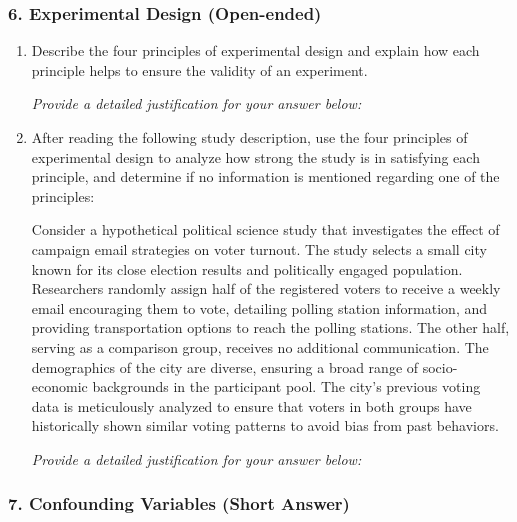 \documentclass{article}
\begin{document}
\subsubsection*{6. Experimental Design (Open-ended)}
\begin{enumerate}
    \item Describe the four principles of experimental design and explain how each principle helps to ensure the validity of an experiment.
    \par \emph{Provide a detailed justification for your answer below:}
        \begin{center}
        \end{center}
    \item After reading the following study description, use the four principles of experimental design to analyze how strong the study is in satisfying each principle, and determine if no information is mentioned regarding one of the principles:
    \par Consider a hypothetical political science study that investigates the effect of campaign email strategies on voter turnout. The study selects a small city known for its close election results and politically engaged population. Researchers randomly assign half of the registered voters to receive a weekly email encouraging them to vote, detailing polling station information, and providing transportation options to reach the polling stations. The other half, serving as a comparison group, receives no additional communication. The demographics of the city are diverse, ensuring a broad range of socio-economic backgrounds in the participant pool. The city’s previous voting data is meticulously analyzed to ensure that voters in both groups have historically shown similar voting patterns to avoid bias from past behaviors.
    \par \emph{Provide a detailed justification for your answer below:}
    \begin{center}
    \end{center}
\end{enumerate}


\subsubsection*{7. Confounding Variables (Short Answer)}
\end{document}
